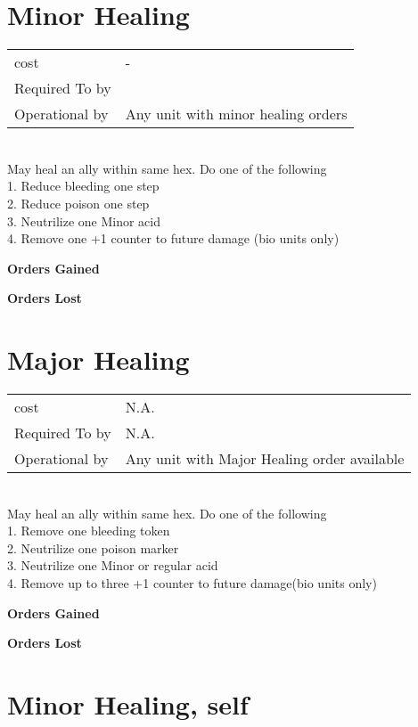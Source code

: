 \section{ Minor Healing }

\begin{tabular}{ll}
  cost & -\\
  Required To by & \\
  Operational by & Any unit with minor healing orders\\

\end{tabular}
\ \\
May heal an ally within same hex. Do one of the following\\ 1. Reduce bleeding one step \\ 2. Reduce poison one step\\ 3. Neutrilize one Minor acid\\ 4. Remove one +1 counter to future damage (bio units only)

{\bf Orders Gained    }

\noindent 

{\bf Orders Lost }

\noindent 
\section{ Major Healing }

\begin{tabular}{ll}
  cost & N.A.\\
  Required To by & N.A.\\
  Operational by & Any unit with Major Healing order available\\

\end{tabular}
\ \\
May heal an ally within same hex. Do one of the following\\ 1. Remove one bleeding token \\ 2. Neutrilize one poison marker\\ 3. Neutrilize one Minor or regular acid\\ 4. Remove up to three +1 counter to future damage(bio units only)

{\bf Orders Gained    }

\noindent 

{\bf Orders Lost }

\noindent 
\section{ Minor Healing, self }

